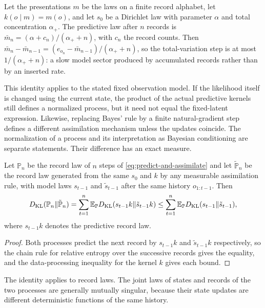 Let the presentations $m$ be the laws on a finite record alphabet, let $k(o\mid m)=m(o)$, and let $s_0$ be a Dirichlet law with parameter $\alpha$ and total concentration $\alpha_+$. The predictive law after $n$ records is $\bar m_n=(\alpha+c_n)/(\alpha_++n)$, with $c_n$ the record counts. Then $\bar m_n-\bar m_{n-1}=(e_{o_n}-\bar m_{n-1})/(\alpha_++n)$, so the total-variation step is at most $1/(\alpha_++n)$: a slow model sector produced by accumulated records rather than by an inserted rate.

This identity applies to the stated fixed observation model. If the likelihood itself is changed using the current state, the product of the actual predictive kernels still defines a normalized process, but it need not equal the fixed-latent expression. Likewise, replacing Bayes' rule by a finite natural-gradient step defines a different assimilation mechanism unless the updates coincide. The normalization of a process and its interpretation as Bayesian conditioning are separate statements. Their difference has an exact measure.

Let $\mathbb P_n$ be the record law of $n$ steps of \cref{eq:predict-and-assimilate} and let $\tilde{\mathbb P}_n$ be the record law generated from the same $s_0$ and $k$ by any measurable assimilation rule, with model laws $s_{t-1}$ and $\tilde s_{t-1}$ after the same history $o_{1:t-1}$. Then
\begin{equation}
D_{\mathrm{KL}}(\mathbb P_n\Vert\tilde{\mathbb P}_n)
=\sum_{t=1}^n\mathbb E_{\mathbb P}D_{\mathrm{KL}}(s_{t-1}k\Vert\tilde s_{t-1}k)
\leq\sum_{t=1}^n\mathbb E_{\mathbb P}D_{\mathrm{KL}}(s_{t-1}\Vert\tilde s_{t-1}),
\label{eq:variational-history}
\end{equation}
where $s_{t-1}k$ denotes the predictive record law.
\begin{proof}
Both processes predict the next record by $s_{t-1}k$ and $\tilde s_{t-1}k$ respectively, so the chain rule for relative entropy over the successive records gives the equality, and the data-processing inequality for the kernel $k$ gives each bound.
\end{proof}

The identity applies to record laws. The joint laws of states and records of the two processes are generally mutually singular, because their state updates are different deterministic functions of the same history.
